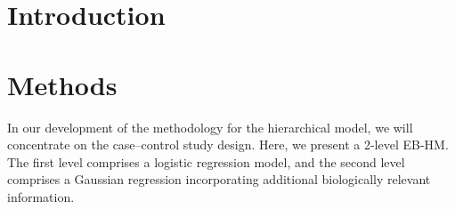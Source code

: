 \documentclass[oupdraft]{bio}
\begin{document}
\section{Introduction}
\label{sec1}

\section{Methods}
\label{sec2}

In our development of the methodology for the hierarchical model,
we will concentrate on the case--control study design. Here, we
present a 2-level EB-HM. The first level comprises a logistic
regression model, and the second level comprises a Gaussian
regression incorporating additional biologically relevant
information.



\end{document}
